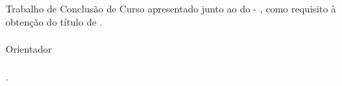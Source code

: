 %
%

\makeatletter
\begin{folhadeaprovacao}

\thispagestyle{empty}%
	
	\begin{center}
    
		\small\textbf{\expandafter\uppercase\expandafter{\imprimirnomeautor}}\\
		\vspace*{2.0 cm}%
		\normalsize\textbf{\expandafter\uppercase\expandafter{\imprimirtitulotb}}
		
    \end{center}
	
	\vspace*{0.35 cm}%
		    \large%
    		\hfill%
	    	\begin{minipage}{8 cm}%
	    		\begin{small} %
	    		\setlength{\baselineskip}{0.7\baselineskip}
				
		    	{Trabalho de Conclusão de Curso apresentado junto ao {\imprimirprograma }
		    	{\imprimirmodalidade} do {\imprimirinstituicao}{ - }{\imprimirdepartamento},
		    	como requisito à obtenção do título de
		    	{\imprimirgrau }.}\\{
		    	}\vspace*{0.6 cm}\\Orientador\\ \\
		    	{\imprimirtitulacaoorientador }{ }{\imprimirorientador.}\\\\
				
				\end{small} %
		    \end{minipage}%
		    	
		    \vspace*{0.6 cm}%
		    
		    \large%
    		\hfill%
	    	 
		    
		    \normalsize %
		    \vspace*{0.5 cm}%
		    

\end{folhadeaprovacao}
